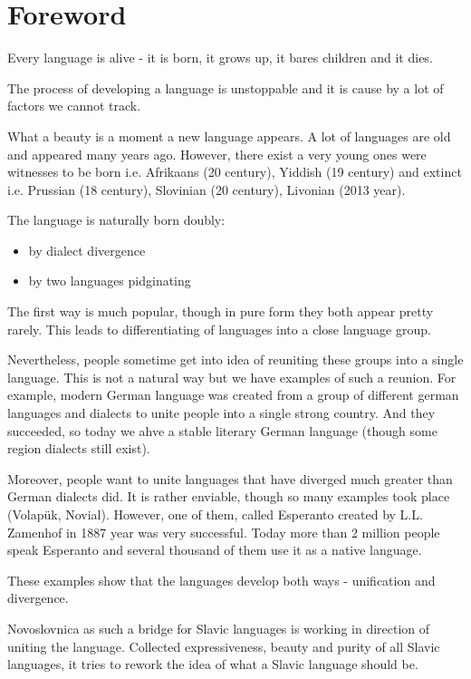 \chapter{Foreword}

Every language is alive - it is born, it grows up, it bares children and it dies.

The process of developing a language is unstoppable and it is cause by a lot of factors we cannot track.

What a beauty is a moment a new language appears. A lot of languages are old and appeared many years ago. However, there exist a very young ones were witnesses to be born i.e. Afrikaans (20 century), Yiddish (19 century) and extinct i.e. Prussian (18 century), Slovinian (20 century), Livonian (2013 year).

The language is naturally born doubly:

\begin{itemize}
	\item by dialect divergence
	\item by two languages pidginating 
\end{itemize}

The first way is much popular, though in pure form they both appear pretty rarely. This leads to differentiating of languages into a close language group.

Nevertheless, people sometime get into idea of reuniting these groups into a single language. This is not a natural way but we have examples of such a reunion. For example, modern German language was created from a group of different german languages and dialects to unite people into a single strong country. And they succeeded, so today we ahve a stable literary German language (though some region dialects still exist).

Moreover, people want to unite languages that have diverged much greater than German dialects did. It is rather enviable, though so many examples took place (Volapük, Novial). However, one of them, called Esperanto created by L.L. Zamenhof in 1887 year was very successful. Today more than 2 million people speak Esperanto and several thousand of them use it as a native language.

These examples show that the languages develop both ways - unification and divergence.

Novoslovnica as such a bridge for Slavic languages is working in direction of uniting the language. Collected expressiveness, beauty and purity of all Slavic languages, it tries to rework the idea of what a Slavic language should be.


